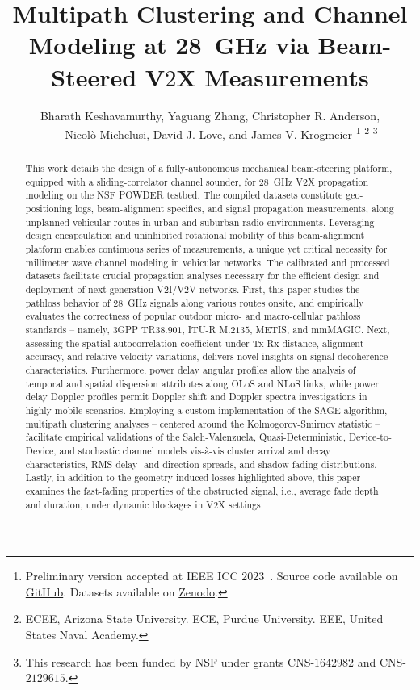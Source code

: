 \documentclass[12pt, draftcls, onecolumn]{IEEEtran}
\title{Multipath Clustering and Channel Modeling at \SI{28}{\giga\hertz} via Beam-Steered V$2$X Measurements}
\author{Bharath Keshavamurthy\IEEEauthorrefmark{1}, Yaguang Zhang\IEEEauthorrefmark{2}, Christopher R. Anderson\IEEEauthorrefmark{3},\\\ \ \ \ Nicol\`{o} Michelusi\IEEEauthorrefmark{1}, David J. Love\IEEEauthorrefmark{2}, and James V. Krogmeier\IEEEauthorrefmark{2}
\thanks{Preliminary version accepted at IEEE ICC $2023$~\cite{ICC}. Source code available on \href{https://github.com/bharathkeshavamurthy/SPAVE-28G.git}{GitHub}\cite{SPAVE-28G-Software}. Datasets available on \href{https://doi.org/10.5281/zenodo.7178597}{Zenodo}\cite{SPAVE-28G-Dataset}.}
\thanks{\IEEEauthorrefmark{1}ECEE, Arizona State University. \IEEEauthorrefmark{2}ECE, Purdue University. \IEEEauthorrefmark{3}EEE, United States Naval Academy.}
\thanks{This research has been funded by NSF under grants CNS-$1642982$ and CNS-$2129615$.}
\vspace{-8mm}
}
\begin{document}

\maketitle
\thispagestyle{plain}
\pagestyle{plain}
\vspace{-8mm}

\begin{abstract}
This work details the design of a fully-autonomous mechanical beam-steering platform, equipped with a sliding-correlator channel sounder, for \SI{28}{\giga\hertz} V2X propagation modeling on the NSF POWDER testbed. The compiled datasets constitute geo-positioning logs, beam-alignment specifics, and signal propagation measurements, along unplanned vehicular routes in urban and suburban radio environments. Leveraging design encapsulation and uninhibited rotational mobility of this beam-alignment platform enables continuous series of measurements, a unique yet critical necessity for millimeter wave channel modeling in vehicular networks. The calibrated and processed datasets facilitate crucial propagation analyses necessary for the efficient design and deployment of next-generation V$2$I/V$2$V networks. First, this paper studies the pathloss behavior of \SI{28}{\giga\hertz} signals along various routes onsite, and empirically evaluates the correctness of popular outdoor micro- and macro-cellular pathloss standards -- namely, $3$GPP TR$38.901$, ITU-R M$.2135$, METIS, and mmMAGIC. Next, assessing the spatial autocorrelation coefficient under Tx-Rx distance, alignment accuracy, and relative velocity variations, delivers novel insights on signal decoherence characteristics. Furthermore, power delay angular profiles allow the analysis of temporal and spatial dispersion attributes along OLoS and NLoS links, while power delay Doppler profiles permit Doppler shift and Doppler spectra investigations in highly-mobile scenarios. Employing a custom implementation of the SAGE algorithm, multipath clustering analyses -- centered around the Kolmogorov-Smirnov statistic -- facilitate empirical validations of the Saleh-Valenzuela, Quasi-Deterministic, Device-to-Device, and stochastic channel models vis-\`{a}-vis cluster arrival and decay characteristics, RMS delay- and direction-spreads, and shadow fading distributions. Lastly, in addition to the geometry-induced losses highlighted above, this paper examines the fast-fading properties of the obstructed signal, i.e., average fade depth and duration, under dynamic blockages in V2X settings.
\end{abstract}
\vspace{-4mm}
\end{document}
